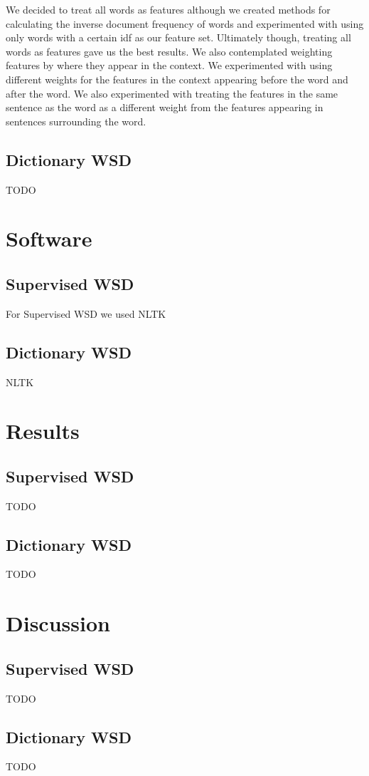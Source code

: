 \documentclass[11pt]{article}
\begin{document}
We decided to treat all words as features although we created methods for calculating the inverse document frequency of words and experimented with using only words with a certain idf as our feature set. Ultimately though, treating all words as features gave us the best results. We also contemplated weighting features by where they appear in the context. We experimented with using different weights for the features in the context appearing before the word and after the word. We also experimented with treating the features in the same sentence as the word as a different weight from the features appearing in sentences surrounding the word.

\subsection{Dictionary WSD}
TODO


\section{Software}
\subsection{Supervised WSD}
For Supervised WSD we used NLTK 

\subsection{Dictionary WSD}
NLTK


\section{Results}
\subsection{Supervised WSD}
TODO

\subsection{Dictionary WSD}
TODO

\section{Discussion}
\subsection{Supervised WSD}
TODO

\subsection{Dictionary WSD}
TODO
\end{document}
